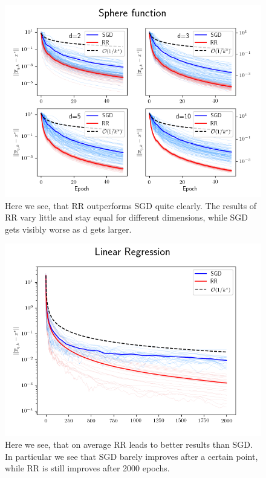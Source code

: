 \documentclass[10pt,conference,compsocconf]{IEEEtran}
\begin{document}
\begin{figure}[h]
  \centering
  \includegraphics[width=\columnwidth]{Sphere_function_runs}
  \caption{Here we see, that RR outperforms SGD quite clearly. The results of RR vary little and stay equal for different dimensions, while SGD gets visibly worse as d gets larger. }
  \vspace{-3mm}
  \label{fig:squareav1}
\end{figure}

\begin{figure}[h]
  \centering
  \includegraphics[width=\columnwidth]{Linear_Regression_run}
  \caption{Here we see, that on average RR leads to better results than SGD. In particular we see that SGD barely improves after a certain point, while RR is still improves after 2000 epochs.}
  \vspace{-3mm}
  \label{fig:leastsquares1}
\end{figure}
\end{document}
